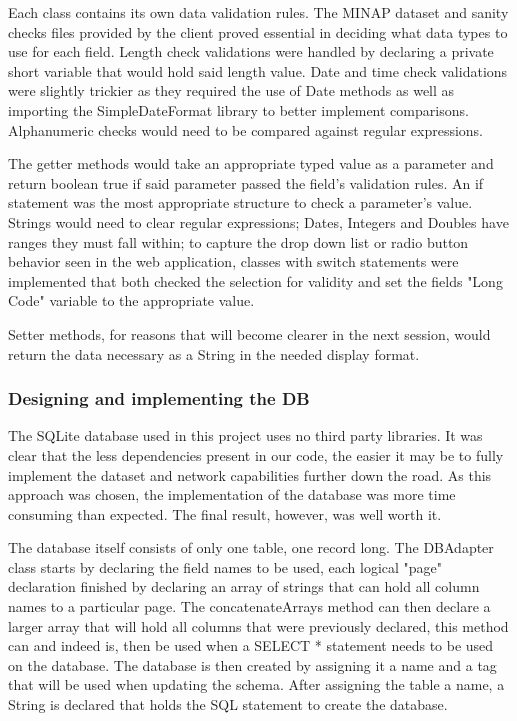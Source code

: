 \documentclass[12pt,a4paper,oneside,titlepage]{article}
\begin{document}
Each class contains its own data validation rules. The MINAP dataset and sanity checks files provided by the client proved essential in deciding what data types to use for each field. Length check validations were handled by declaring a private short variable that would hold said length value. Date and time check validations were slightly trickier as they required the use of Date methods as well as importing the SimpleDateFormat library to better implement comparisons. Alphanumeric checks would need to be compared against regular expressions.

The getter methods would take an appropriate typed value as a parameter and return boolean true if said parameter passed the field's validation rules. An if statement was the most appropriate structure to check a parameter's value. Strings would need to clear regular expressions; Dates, Integers and Doubles have ranges they must fall within; to capture the drop down list or radio button behavior seen in the web application, classes with switch statements were implemented that both checked the selection for validity and set the fields "Long Code" variable to the appropriate value.

Setter methods, for reasons that will become clearer in the next session, would return the data necessary as a String in the needed display format.

\subsubsection{Designing and implementing the DB}
The SQLite database used in this project uses no third party libraries. It was clear that the less dependencies present in our code, the easier it may be to fully implement the dataset and network capabilities further down the road. As this approach was chosen, the implementation of the database was more time consuming than expected. The final result, however, was well worth it.

The database itself consists of only one table, one record long. The DBAdapter class starts by declaring the field names to be used, each logical "page" declaration finished by declaring an array of strings that can hold all column names to a particular page. The concatenateArrays method can then declare a larger array that will hold all columns that were previously declared, this method can and indeed is, then be used when a SELECT * statement needs to be used on the database. The database is then created by assigning it a name and a tag that will be used when updating the schema. After assigning the table a name, a String is declared that holds the SQL statement to create the database.
\end{document}
